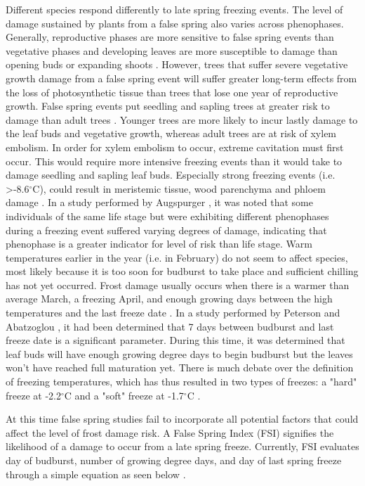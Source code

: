 \documentclass{article}\usepackage[]{graphicx}\usepackage[]{color}
\begin{document}
Different species respond differently to late spring freezing events. The level of damage sustained by plants from a false spring also varies across phenophases. Generally, reproductive phases are more sensitive to false spring events than vegetative phases and developing leaves are more susceptible to damage than opening buds or expanding shoots \citep{Lenz2013,Augspurger2009}
. However, trees that suffer severe vegetative growth damage from a false spring event will suffer greater long-term effects from the loss of photosynthetic tissue than trees that lose one year of reproductive growth. False spring events put seedling and sapling trees at greater risk to damage than adult trees \citep{Vitasse2014}. Younger trees are more likely to incur lastly damage to the leaf buds and vegetative growth, whereas adult trees are at risk of xylem embolism. In order for xylem embolism to occur, extreme cavitation must first occur. This would require more intensive freezing events than it would take to damage seedling and sapling leaf buds. Especially strong freezing events (i.e. >-8.6$^{\circ}$C), could result in meristemic tissue, wood parenchyma and phloem damage \citep{Lenz2013, Augspurger2011, Sakai1987}. In a study performed by Augspurger \citeyear{Augspurger2009}, it was noted that some individuals of the same life stage but were exhibiting different phenophases during a freezing event suffered varying degrees of damage, indicating that phenophase is a greater indicator for level of risk than life stage. 
Warm temperatures earlier in the year (i.e. in February) do not seem to affect species, most likely because it is too soon for budburst to take place and sufficient chilling has not yet occurred. Frost damage usually occurs when there is a warmer than average March, a freezing April, and enough growing days between the high temperatures and the last freeze date \citep{Augspurger2013}. 
In a study performed by Peterson and Abatzoglou \citeyear{Peterson2014}, it had been determined that 7 days between budburst and last freeze date is a significant parameter. During this time, it was determined that leaf buds will have enough growing degree days to begin budburst but the leaves won't have reached full maturation yet. There is much debate over the definition of freezing temperatures, which has thus resulted in two types of freezes: a "hard" freeze at -2.2$^{\circ}$C and a "soft" freeze at -1.7$^{\circ}$C \citep{Augspurger2013, Kodra2011, Vavrus2006}.

At this time false spring studies fail to incorporate all potential factors that could affect the level of frost damage risk. A False Spring Index (FSI) signifies the likelihood of a damage to occur from a late spring freeze. Currently, FSI evaluates day of budburst, number of growing degree days, and day of last spring freeze through a simple equation as seen below \citep{Marino2011}. 
\end{document}
